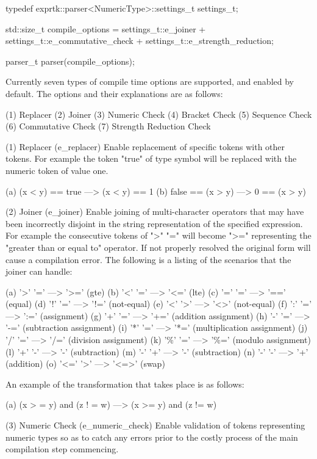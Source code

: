 typedef exprtk::parser<NumericType>::settings\_t settings\_t;

std::size\_t compile\_options = settings\_t::e\_joiner            +
settings\_t::e\_commutative\_check +
settings\_t::e\_strength\_reduction;

parser\_t parser(compile\_options);


Currently  seven  types of  compile  time options  are  supported, and
enabled by default. The options and their explanations are as follows:

(1) Replacer
(2) Joiner
(3) Numeric Check
(4) Bracket Check
(5) Sequence Check
(6) Commutative Check
(7) Strength Reduction Check


(1) Replacer (e\_replacer)
Enable replacement of specific  tokens with other tokens.  For example
the token  "true" of  type symbol  will be  replaced with  the numeric
token of value one.

(a) (x < y) == true   --->  (x < y) == 1
(b) false == (x > y)  --->  0 == (x > y)


(2) Joiner (e\_joiner)
Enable  joining  of  multi-character  operators  that  may  have  been
incorrectly  disjoint in the  string  representation  of the specified
expression. For example the consecutive tokens of ">" "=" will  become
">=" representing  the "greater  than or  equal to"  operator. If  not
properly resolved the  original form will  cause a compilation  error.
The  following  is  a listing  of the  scenarios that  the joiner  can
handle:

(a) '>' '='  --->  '>='  (gte)
(b) '<' '='  --->  '<='  (lte)
(c) '=' '='  --->  '=='  (equal)
(d) '!' '='  --->  '!='  (not-equal)
(e) '<' '>'  --->  '<>'  (not-equal)
(f) ':' '='  --->  ':='  (assignment)
(g) '+' '='  --->  '+='  (addition assignment)
(h) '-' '='  --->  '-='  (subtraction assignment)
(i) '*' '='  --->  '*='  (multiplication assignment)
(j) '/' '='  --->  '/='  (division assignment)
(k) '\%' '='  --->  '\%='  (modulo assignment)
(l) '+' '-'  --->  '-'   (subtraction)
(m) '-' '+'  --->  '-'   (subtraction)
(n) '-' '-'  --->  '+'   (addition)
(o) '<=' '>' --->  '<=>' (swap)


An example of the transformation that takes place is as follows:

(a) (x > = y) and (z ! = w)  --->  (x >= y) and (z != w)


(3) Numeric Check (e\_numeric\_check)
Enable validation of tokens representing numeric types so as to  catch
any errors prior  to the costly  process of the  main compilation step
commencing.


